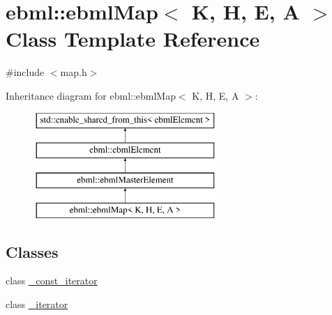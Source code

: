 \hypertarget{classebml_1_1ebmlMap}{}\section{ebml\+:\+:ebml\+Map$<$ K, H, E, A $>$ Class Template Reference}
\label{classebml_1_1ebmlMap}


{\ttfamily \#include $<$map.\+h$>$}

Inheritance diagram for ebml\+:\+:ebml\+Map$<$ K, H, E, A $>$\+:\begin{figure}[H]
\begin{center}
\leavevmode
\includegraphics[height=4.000000cm]{classebml_1_1ebmlMap}
\end{center}
\end{figure}
\subsection*{Classes}
\begin{DoxyCompactItemize}
\item 
class \mbox{\hyperlink{classebml_1_1ebmlMap_1_1__const__iterator}{\+\_\+const\+\_\+iterator}}
\item 
class \mbox{\hyperlink{classebml_1_1ebmlMap_1_1__iterator}{\+\_\+iterator}}
\end{DoxyCompactItemize}
